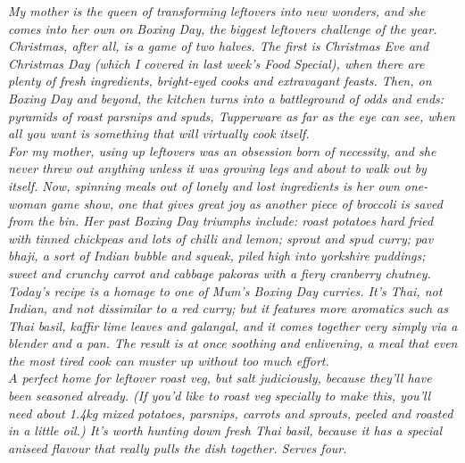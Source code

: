 \documentclass{book}
\begin{document}
\emph{My mother is the queen of transforming leftovers into new wonders, and she comes into her own on Boxing Day, the biggest leftovers challenge of the year.\\ 
Christmas, after all, is a game of two halves. The first is Christmas Eve and Christmas Day (which I covered in last week’s Food Special), when there are plenty of fresh ingredients, bright-eyed cooks and extravagant feasts. Then, on Boxing Day and beyond, the kitchen turns into a battleground of odds and ends: pyramids of roast parsnips and spuds, Tupperware as far as the eye can see, when all you want is something that will virtually cook itself.\\ 
For my mother, using up leftovers was an obsession born of necessity, and she never threw out anything unless it was growing legs and about to walk out by itself. Now, spinning meals out of lonely and lost ingredients is her own one-woman game show, one that gives great joy as another piece of broccoli is saved from the bin. Her past Boxing Day triumphs include: roast potatoes hard fried with tinned chickpeas and lots of chilli and lemon; sprout and spud curry; pav bhaji, a sort of Indian bubble and squeak, piled high into yorkshire puddings; sweet and crunchy carrot and cabbage pakoras with a fiery cranberry chutney.\\ 
Today’s recipe is a homage to one of Mum’s Boxing Day curries. It’s Thai, not Indian, and not dissimilar to a red curry; but it features more aromatics such as Thai basil, kaffir lime leaves and galangal, and it comes together very simply via a blender and a pan. The result is at once soothing and enlivening, a meal that even the most tired cook can muster up without too much effort.\\ 
A perfect home for leftover roast veg, but salt judiciously, because they’ll have been seasoned already. (If you’d like to roast veg specially to make this, you’ll need about 1.4kg mixed potatoes, parsnips, carrots and sprouts, peeled and roasted in a little oil.) It’s worth hunting down fresh Thai basil, because it has a special aniseed flavour that really pulls the dish together. Serves four.}\\\\ 
\end{document}

